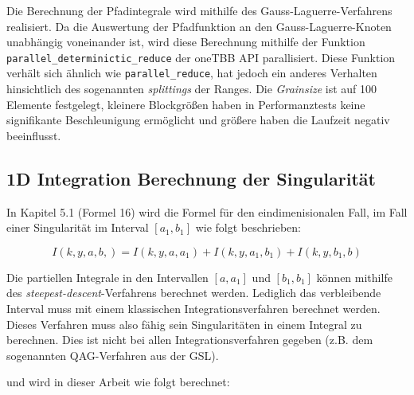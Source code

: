 Die Berechnung der Pfadintegrale wird mithilfe des Gauss-Laguerre-Verfahrens realisiert.
Da die Auswertung der Pfadfunktion an den Gauss-Laguerre-Knoten unabhängig voneinander ist,
 wird diese Berechnung mithilfe der Funktion \linebreak \texttt{parallel\_determinictic\_reduce} der oneTBB API parallisiert.
Diese Funktion verhält sich ähnlich wie \texttt{parallel\_reduce}, hat jedoch ein anderes Verhalten hinsichtlich des sogenannten \textit{splittings} der Ranges. 
Die \textit{Grainsize} ist auf 100 Elemente festgelegt, kleinere Blockgrößen haben in Performanztests keine signifikante Beschleunigung ermöglicht und größere haben die Laufzeit negativ beeinflusst.

\begin{center}
    
    \label{gauss_laguerre_impl}
\end{center}


\subsection{1D Integration Berechnung der Singularität}

In Kapitel 5.1 \cite[12]{gasperini:hal-03209144} (Formel 16) wird die Formel für den eindimenisionalen Fall, im Fall einer Singularität im Interval $[a_1, b_1]$ wie folgt beschrieben:

\begin{equation}
    I(k,y,a,b,) = I(k,y,a,a_1) + I(k,y,a_1, b_1) + I(k,y,b_1,b)
\end{equation}

Die partiellen Integrale in den Intervallen $[a,a_1]$ und  $[b_1,b_1]$ können mithilfe des \textit{steepest-descent}-Verfahrens berechnet werden.
Lediglich das verbleibende Interval muss mit einem klassischen Integrationsverfahren berechnet werden.
Dieses Verfahren muss also fähig sein Singularitäten in einem Integral zu berechnen. Dies ist nicht bei allen Integrationsverfahren gegeben (z.B. dem sogenannten QAG-Verfahren aus der GSL).

und wird in dieser Arbeit wie folgt berechnet:
\begin{center}
    
\end{center}

